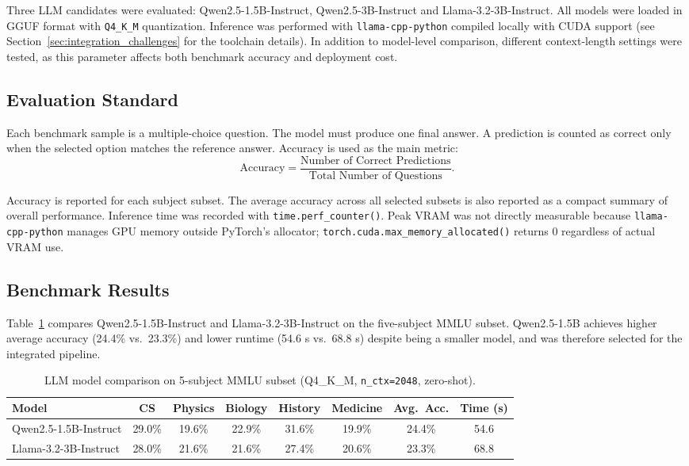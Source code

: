 \documentclass[12pt, a4paper]{article}
\begin{document}
Three LLM candidates were evaluated: Qwen2.5-1.5B-Instruct, Qwen2.5-3B-Instruct and Llama-3.2-3B-Instruct. All models were loaded in GGUF format with \texttt{Q4\_K\_M} quantization. Inference was performed with \texttt{llama-cpp-python} compiled locally with CUDA support (see Section~\ref{sec:integration_challenges} for the toolchain details). In addition to model-level comparison, different context-length settings were tested, as this parameter affects both benchmark accuracy and deployment cost.

\subsection{Evaluation Standard}

Each benchmark sample is a multiple-choice question. The model must produce one final answer. A prediction is counted as correct only when the selected option matches the reference answer. Accuracy is used as the main metric:
\[
\mathrm{Accuracy} =
\frac{\text{Number of Correct Predictions}}
{\text{Total Number of Questions}}.
\]

Accuracy is reported for each subject subset. The average accuracy across all selected subsets is also reported as a compact summary of overall performance. Inference time was recorded with \texttt{time.perf\_counter()}. Peak VRAM was not directly measurable because \texttt{llama-cpp-python} manages GPU memory outside PyTorch's allocator; \texttt{torch.cuda.max\_memory\_allocated()} returns 0 regardless of actual VRAM use.

\subsection{Benchmark Results}

Table~\ref{tab:llm_results} compares Qwen2.5-1.5B-Instruct and Llama-3.2-3B-Instruct on the five-subject MMLU subset. Qwen2.5-1.5B achieves higher average accuracy (24.4\% vs.\ 23.3\%) and lower runtime (54.6 s vs.\ 68.8 s) despite being a smaller model, and was therefore selected for the integrated pipeline.

\begin{table}[H]
\centering
\caption{LLM model comparison on 5-subject MMLU subset (Q4\_K\_M, \texttt{n\_ctx=2048}, zero-shot).}
\label{tab:llm_results}
\begin{tabular}{lccccccc}
\toprule
Model & CS & Physics & Biology & History & Medicine & Avg.\ Acc. & Time (s) \\
\midrule
Qwen2.5-1.5B-Instruct & 29.0\% & 19.6\% & 22.9\% & 31.6\% & 19.9\% & 24.4\% & \phantom{0}54.6 \\
Llama-3.2-3B-Instruct & 28.0\% & 21.6\% & 21.6\% & 27.4\% & 20.6\% & 23.3\% & \phantom{0}68.8 \\
\bottomrule
\end{tabular}
\end{table}
\end{document}
